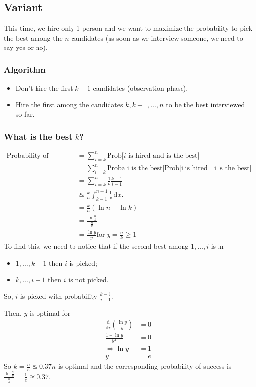 \subsection{Variant}
This time, we hire only 1 person and we want to maximize the probability to pick the best among the $n$ candidates (as soon as we interview someone, we need to say yes or no).

\subsubsection{Algorithm}
\begin{itemize}
\item Don't hire the first $k-1$ candidates (observation phase).
\item Hire the first among the candidates $k, k+1, \ldots, n$ to be the best interviewed so far.
\end{itemize}
\subsubsection{What is the best $k$?}
\begin{align*}
\text{Probability of success} &= \sum_{i=k}^n \text{Prob[$i$ is hired and is the best]}\\
&= \sum_{i=k}^n  \text{Proba[i is the best]} \text{Prob[i is hired | i is the best]}\\
&= \sum_{i=k}^n  \frac{1}{n} \frac{k-1}{i-1}\\
&\approxeq \frac{k}{n} \int_{k-1}^{n-1} \frac{1}{x} \, \mathrm{d}x.\\
&= \frac{k}{n} (\ln n - \ln k)\\
&= \frac{\ln \frac{n}{k}}{\frac{n}{k}}\\
&= \frac{\ln y}{y} \text{for $y = \frac{n}{k} \geq 1$}
\end{align*}
To find this, we need to notice that if the second best among $1,\ldots,i$ is in 
\begin{itemize}
\item $1,\ldots, k-1$ then $i$ is picked;
\item $k,\ldots, i-1$ then $i$ is not picked.
\end{itemize}
So, $i$ is picked with probability $\frac{k-1}{i-1}$.

Then, $y$ is optimal for 
\begin{align*}
\frac{\mathrm{d}}{\mathrm{d}y} \left(\frac{\ln y}{y} \right) &= 0\\
\frac{1- \ln y}{y^2} &= 0\\
\Rightarrow \ln y &= 1\\
y &= e
\end{align*}
So $k = \frac{n}{e} \approxeq 0.37n$ is optimal and the corresponding probability of success is $\frac{\ln \frac{n}{k}}{\frac{n}{k}} = \frac{1}{e} \approxeq 0.37$.



